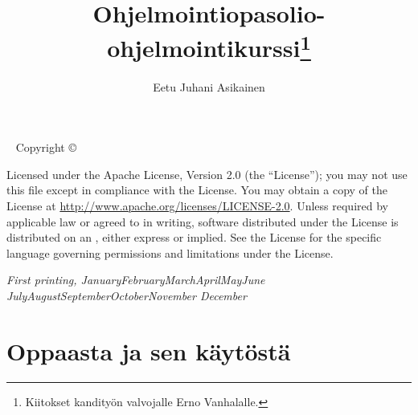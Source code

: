 \documentclass{tufte-book}
\title{Ohjelmointiopas{\small \lutin olio-ohjelmointikurssi}\thanks{Kiitokset kandityön valvojalle
Erno Vanhalalle.}}
\author[Eetu Juhani Asikainen]{Eetu Juhani Asikainen}
\newcommand{\monthyear}{
  \ifcase\month\or January\or February\or March\or April\or May\or June\or
  July\or August\or September\or October\or November\or
  December\fi\space\number\year
}
\begin{document}
\frontmatter

\maketitle

\newpage
\begin{fullwidth}
~\vfill
\thispagestyle{empty}
\setlength{\parindent}{0pt}
\setlength{\parskip}{\baselineskip}
Copyright \copyright\ \the\year\ \thanklessauthor

\par{}

\par{}

\par Licensed under the Apache License, Version 2.0 (the ``License''); you may not
use this file except in compliance with the License. You may obtain a copy
of the License at \url{http://www.apache.org/licenses/LICENSE-2.0}. Unless
required by applicable law or agreed to in writing, software distributed
under the License is distributed on an , either express or implied. See the
License for the specific language governing permissions and limitations
under the License.

\par\textit{First printing, \monthyear}
\end{fullwidth}

\tableofcontents


\mainmatter


\chapter{Oppaasta ja sen käytöstä}
\label{oppaasta}
\end{document}
